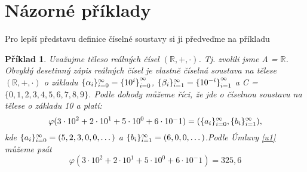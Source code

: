 \documentclass[12pt]{book}
\newtheorem*{pr}{Příklad}
\begin{document}
\newpage
\section{Názorné příklady}
Pro lepší představu definice číselné soustavy si ji předveďme na příkladu
\begin{pr}
	Uvažujme těleso reálných čísel $(\mathbb{R},+,\cdot)$. Tj. zvolili jsme A = $\mathbb{R}$. Obvyklý desetinný zápis reálných čísel je vlastně číselná soustava na tělese $(\mathbb{R},+,\cdot)$ o základu $\{\alpha_i\}_{i=0}^{\infty}=\{{10^i\}}_{i=0}^{\infty}$, $\{\beta_i\}_{i=1}^{\infty}=\{{10^{-i}\}}_{i=1}^{\infty}$ a C = $\{0,1,2,3,4,5,6,7,8,9\}$. Podle dohody můžeme říci, že jde o číselnou soustavu na tělese o základu 10 a platí:
	$$\varphi(3\cdot10^2+2\cdot10^1+5\cdot10^0+6\cdot10^-1)=(\{a_i\}_{i=0}^{\infty},\{b_i\}_{i=1}^{\infty}),$$kde
	$\{a_i\}_{i=0}^{\infty}=(5,2,3,0,0,\dots)$ a $\{b_i\}_{i=1}^{\infty} = (6,0,0,\dots)$.\newline Podle Úmluvy \ref{u1} můžeme psát $$\varphi(3\cdot10^2+2\cdot10^1+5\cdot10^0+6\cdot10^-1)=325,6$$
	
	
	
\end{pr}
\end{document}
